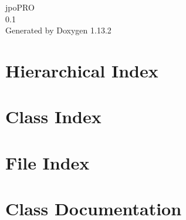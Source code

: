 \documentclass[twoside]{book}
\newcommand{\+}{\discretionary{\mbox{\scriptsize$\hookleftarrow$}}{}{}}
\newcommand{\clearemptydoublepage}{%
    \newpage{\pagestyle{empty}\cleardoublepage}%
  }
\begin{document}
  \raggedbottom
    \hypersetup{pageanchor=false,
                bookmarksnumbered=true,
                pdfencoding=unicode
               }
  \begin{titlepage}
  \vspace*{7cm}
  \begin{center}%
  {\Large jpo\+PRO}\\
  [1ex]\large 0.\+1 \\
  \vspace*{1cm}
  {\large Generated by Doxygen 1.13.2}\\
  \end{center}
  \end{titlepage}
  \clearemptydoublepage
  \tableofcontents
  \clearemptydoublepage
  \hypersetup{pageanchor=true}

\chapter{Hierarchical Index}

\chapter{Class Index}

\chapter{File Index}

\chapter{Class Documentation}









\end{document}
